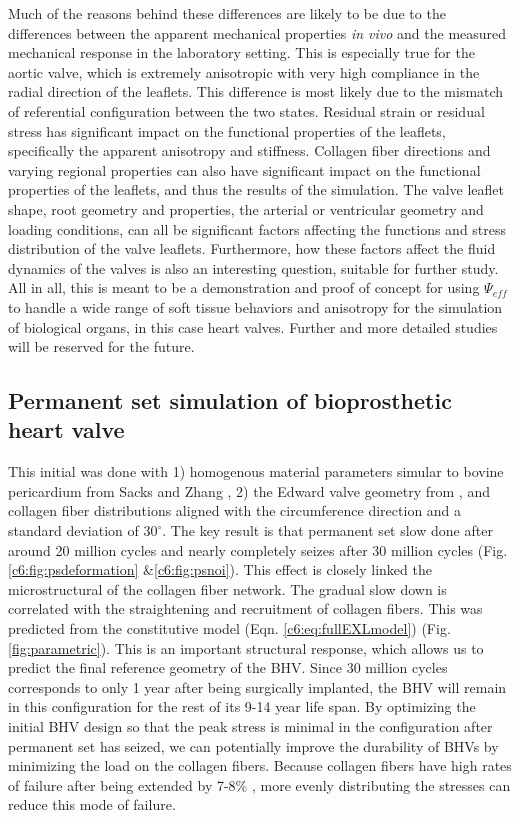     Much of the reasons behind these differences are likely to be due to the differences between the apparent mechanical properties \textit{in vivo} and the measured mechanical response in the laboratory setting. This is especially true for the aortic valve, which is extremely anisotropic with very high compliance in the radial direction of the leaflets. This difference is most likely due to the mismatch of referential configuration between the two states. Residual strain or residual stress has significant impact on the functional properties of the leaflets, specifically the apparent anisotropy and stiffness. Collagen fiber directions and varying regional properties can also have significant impact on the functional properties of the leaflets, and thus the results of the simulation. The valve leaflet shape, root geometry and properties, the arterial or ventricular geometry and loading conditions, can all be significant factors affecting the functions and stress distribution of the valve leaflets. Furthermore, how these factors affect the fluid dynamics of the valves is also an interesting question, suitable for further study. All in all, this is meant to be a demonstration and proof of concept for using $\Psi_{eff}$ to handle a wide range of soft tissue behaviors and anisotropy for the simulation of biological organs, in this case heart valves. Further and more detailed studies will be reserved for the future.  



\subsection{Permanent set simulation of bioprosthetic heart valve}
    This initial was done with 1) homogenous material parameters simular to bovine pericardium from Sacks and Zhang \cite{sacks_novel_2016}, 2) the Edward valve geometry from \cite{aggarwal_inverse_2015}, and collagen fiber distributions aligned with the circumference direction and a standard deviation of $30^\circ$. The key result is that permanent set slow done after around 20 million cycles and nearly completely seizes after 30 million cycles (Fig. \ref{c6:fig:psdeformation} \&\ref{c6:fig:psnoi}). This effect is closely linked the microstructural of the collagen fiber network. The gradual slow down is correlated with the straightening and recruitment of collagen fibers. This was predicted from the constitutive model (Eqn. \ref{c6:eq:fullEXLmodel}) (Fig. \ref{fig:parametric}). This is an important structural response, which allows us to predict the final reference geometry of the BHV. Since 30 million cycles corresponds to only 1 year after being surgically implanted, the BHV will remain in this configuration for the rest of its 9-14 year life span. By optimizing the initial BHV design so that the peak stress is minimal in the configuration after permanent set has seized, we can potentially improve the durability of BHVs by minimizing the load on the collagen fibers. Because collagen fibers have high rates of failure after being extended by 7-8\% \cite{lanir_structural_1979}\cite{buehler_atomistic_2006}, more evenly distributing the stresses can reduce this mode of failure. 
    
